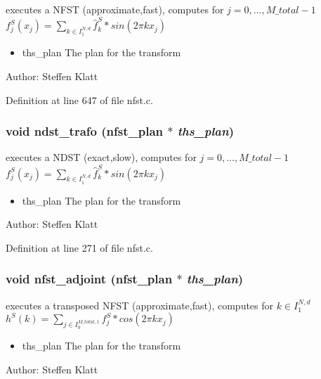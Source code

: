 executes a NFST (approximate,fast), computes for $j=0,...,M\_total-1$ $f_j^S(x_j) = \sum_{k \in I_1^{N,d}} \hat{f}_k^S * sin(2 \pi k x_j)$ 

\begin{itemize}
\item ths\_\-plan The plan for the transform\end{itemize}
\begin{Desc}
\item[Author:]Steffen Klatt \end{Desc}


Definition at line 647 of file nfst.c.\hypertarget{group__nfsct_g5ef7b3146d464de1d0f41de100f63bc6}{
\subsubsection{\setlength{\rightskip}{0pt plus 5cm}void ndst\_\-trafo ({\bf nfst\_\-plan} $\ast$ {\em ths\_\-plan})}}
\label{group__nfsct_g5ef7b3146d464de1d0f41de100f63bc6}


executes a NDST (exact,slow), computes for $j=0,...,M\_total-1$ $f_j^S(x_j) = \sum_{k \in I_1^{N,d}} \hat{f}_k^S * sin(2 \pi k x_j)$ 

\begin{itemize}
\item ths\_\-plan The plan for the transform\end{itemize}
\begin{Desc}
\item[Author:]Steffen Klatt \end{Desc}


Definition at line 271 of file nfst.c.\hypertarget{group__nfsct_g0ae3871b80dda28e7aabe541a48d34e2}{
\subsubsection{\setlength{\rightskip}{0pt plus 5cm}void nfst\_\-adjoint ({\bf nfst\_\-plan} $\ast$ {\em ths\_\-plan})}}
\label{group__nfsct_g0ae3871b80dda28e7aabe541a48d34e2}


executes a transposed NFST (approximate,fast), computes for $k \in I_1^{N,d}$ $h^S(k) = \sum_{j \in I_0^{M\_total,1}} f_j^S * cos(2 \pi k x_j)$ 

\begin{itemize}
\item ths\_\-plan The plan for the transform\end{itemize}
\begin{Desc}
\item[Author:]Steffen Klatt \end{Desc}


